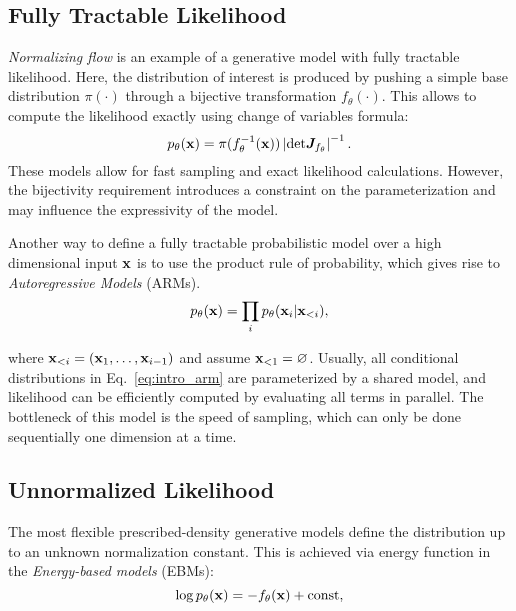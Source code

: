 \subsection{Fully Tractable Likelihood}
\textit{Normalizing flow} is an example of a generative model with fully tractable likelihood. Here, the distribution of interest is produced by pushing a simple base distribution $\pi(\cdot)$ through a bijective transformation $f_{\theta}(\cdot)$. This allows to compute the likelihood exactly using change of variables formula:
\begin{equation}\label{eq:intro_nf}
    p_{\theta}(\rvx) = \pi(f^{-1}_{\theta}(\rvx)) \left|\text{det}\mJ_{f_{\theta}}  \right|^{-1}.
\end{equation}
These models allow for fast sampling and exact likelihood calculations. However, the bijectivity requirement introduces a constraint on the parameterization and may influence the expressivity of the model. 

Another way to define a fully tractable probabilistic model over a high dimensional input ${\mathbf{x}}$ is to use the product rule of probability, which gives rise to \textit{Autoregressive Models} (ARMs).  
\begin{equation}\label{eq:intro_arm}
    p_{\theta}(\rvx) = \prod_{i}p_{\theta}(\rvx_i | \rvx_{<i}),
\end{equation}

where ${\mathbf{x}}_{<i} = ({\mathbf{x}}_1, \dots, {\mathbf{x}}_{i-1})$ and assume ${\mathbf{x}}_{<1} = \varnothing$. Usually, all conditional distributions in Eq.~\ref{eq:intro_arm} are parameterized by a shared model, and likelihood can be efficiently computed by evaluating all terms in parallel. The bottleneck of this model is the speed of sampling, which can only be done sequentially one dimension at a time.

\subsection{Unnormalized Likelihood}
The most flexible prescribed-density generative models define the distribution up to an unknown normalization constant.
This is achieved via energy function in the \textit{Energy-based models} (EBMs): 
\begin{equation}
    \log p_{\theta}({\mathbf{x}}) = -f_{\theta}({\mathbf{x}}) + \text{const},
\end{equation}

